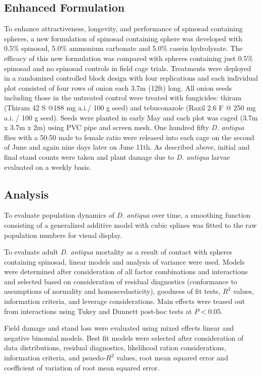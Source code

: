 \documentclass[alpha-refs]{wiley-article}
\begin{document}
\subsection{Enhanced Formulation}

To enhance attractiveness, longevity, and performance of spinosad containing spheres, a new formulation of spinosad containing sphere was developed with 0.5\% spinosad, 5.0\% ammonium carbonate and 5.0\% casein hydrolysate. The efficacy of this new formulation was compared with spheres containing just 0.5\% spinosad and no spinosad controls in field cage trials. Treatments were deployed in a randomized controlled block design with four replications and each individual plot consisted of four rows of onion each 3.7m (12ft)  long. All onion seeds including those in the untreated control were treated with fungicides: thiram (Thiram 42 S {@}188 mg a.i./ 100 g seed) and tebuconazole (Raxil 2.6 F @ 250 mg a.i. / 100 g seed). Seeds were planted in early May and each plot was caged (3.7m x 3.7m x 2m) using PVC pipe and screen mesh. One hundred fifty \textit{D. antiqua} flies with a 50:50 male to female ratio were released into each cage on the second of June and again nine days later on June 11th. As described above, initial and final stand counts were taken and plant damage due to \textit{D. antiqua} larvae evaluated on a weekly basis.  


\subsection{Analysis}

To evaluate population dynamics of \textit{D. antiqua} over time, a smoothing function consisting of a generalized additive model with cubic splines was fitted to the raw population numbers for visual display.  

To evaluate adult \textit{D. antiqua} mortality as a result of contact with spheres containing spinosad, linear models and analysis of variance were used.  Models were determined after consideration of all factor combinations and interactions and selected based on consideration of residual diagnostics (conformance to assumptions of normality and homoscedasticity), goodness of fit tests, $R^2$ values, information criteria, and leverage considerations. Main effects were teased out from interactions using Tukey and Dunnett post-hoc tests at $P < 0.05$.  

Field damage and stand loss were evaluated using mixed effects linear and negative binomial models.  Best fit models were selected after consideration of data distributions, residual diagnostics, likelihood ration considerations, information criteria, and psuedo-$R^2$ values, root mean squared error and coefficient of variation of root mean squared error.  
\end{document}
